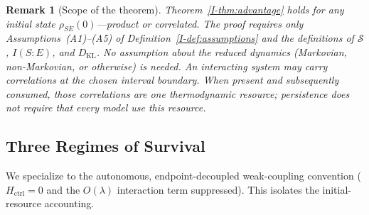 \documentclass[12pt,a4paper,openany]{book}
\newtheorem{remark}[theorem]{Remark}
\begin{document}
\begin{remark}[Scope of the theorem]
\label{I-rem:no_product}
Theorem~\ref{I-thm:advantage} holds for \emph{any} initial
state $\rho_{SE}(0)$---product or correlated.
The proof requires only
Assumptions~\textup{(A1)--(A5)} of
Definition~\ref{I-def:assumptions} and the definitions of
$\mathcal{S}$, $I(S{:}E)$, and $D_{\mathrm{KL}}$.
No assumption about the reduced dynamics (Markovian,
non-Markovian, or otherwise) is needed.
An interacting system may carry correlations at the chosen interval
boundary.  When present and subsequently consumed, those correlations
are one thermodynamic resource; persistence does not require that every
model use this resource.
\end{remark}

\subsection{Three Regimes of Survival}

We specialize to the autonomous, endpoint-decoupled weak-coupling
convention ($H_{\mathrm{ctrl}} = 0$ and the $O(\lambda)$ interaction
term suppressed).  This isolates the initial-resource accounting.
\end{document}
